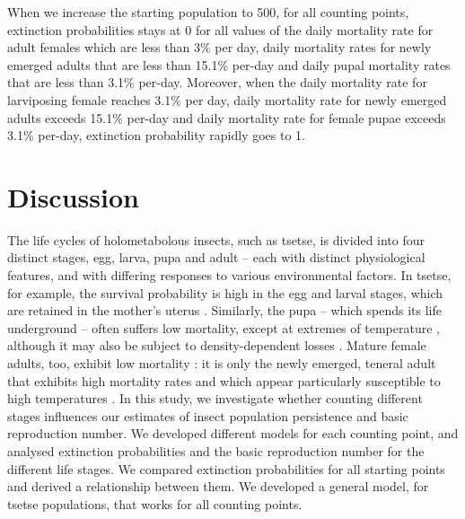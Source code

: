 \documentclass[smallextended]{svjour3}
\begin{document}
When we increase the starting population to 500, for all counting points, extinction probabilities stays at 0 for all values of the daily mortality rate for adult females which are less than 3\% per day, daily mortality rates for newly emerged adults that are less than 15.1\% per-day and daily pupal mortality rates that are less than 3.1\% per-day. Moreover, when the daily mortality rate for larviposing female reaches 3.1\% per day, daily mortality rate for newly emerged adults exceeds 15.1\% per-day and daily mortality rate for female pupae exceeds 3.1\% per-day, extinction probability rapidly goes to 1. 
\newpage

\section{Discussion}

The life cycles of holometabolous insects, such as tsetse, is divided into four distinct stages, egg, larva, pupa and adult – each with distinct physiological features, and with differing responses to various environmental factors. In tsetse, for example,  the survival probability is high in the egg and larval stages, which are retained in the mother’s uterus \cite{Hargrove1999a}. Similarly, the pupa – which spends its life underground – often suffers low mortality, except at extremes of temperature \cite{PhelpsR.J.&Burrows}, although it may also be subject to density-dependent losses \cite{Rogers1984,RogersD.J.Randolph1984}. Mature female adults, too, exhibit low mortality \cite{Hargrove2011}: it is only the newly emerged, teneral adult that exhibits high mortality rates and which appear particularly susceptible to high temperatures \cite{Ackley2017a}. In this study, we investigate whether counting different stages influences our estimates of insect population persistence and basic reproduction number. We developed different models for each counting point, and analysed extinction probabilities and the basic reproduction number for the different life stages. We compared extinction probabilities for all starting points and derived a relationship between them. We developed a general model, for tsetse populations, that works for all counting points. \\
\end{document}
